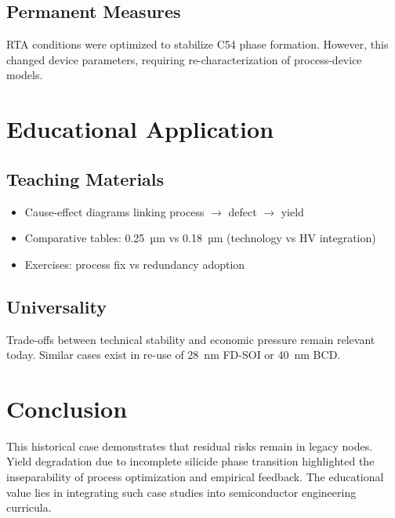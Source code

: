 \documentclass[conference]{IEEEtran}
\begin{document}
\subsection{Permanent Measures}
RTA conditions were optimized to stabilize C54 phase formation.  
However, this changed device parameters, requiring re-characterization of process-device models.

\section{Educational Application}
\subsection{Teaching Materials}
\begin{itemize}
    \item Cause-effect diagrams linking process $\rightarrow$ defect $\rightarrow$ yield
    \item Comparative tables: 0.25~µm vs 0.18~µm (technology vs HV integration)
    \item Exercises: process fix vs redundancy adoption
\end{itemize}

\subsection{Universality}
Trade-offs between technical stability and economic pressure remain relevant today.  
Similar cases exist in re-use of 28~nm FD-SOI or 40~nm BCD.

\section{Conclusion}
This historical case demonstrates that residual risks remain in legacy nodes.  
Yield degradation due to incomplete silicide phase transition highlighted the inseparability of process optimization and empirical feedback.  
The educational value lies in integrating such case studies into semiconductor engineering curricula.
\end{document}
